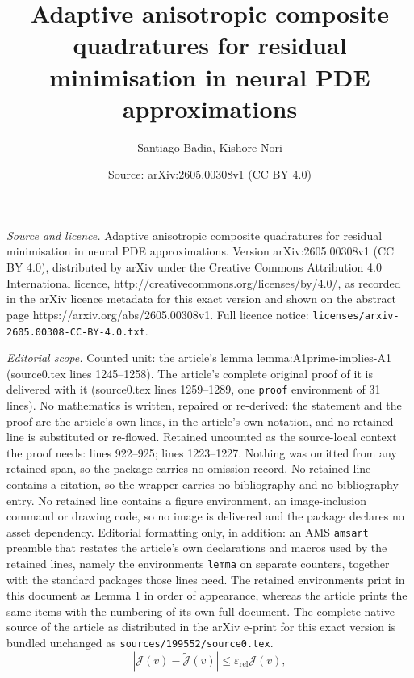 \documentclass[10pt,a4paper]{amsart}
\title{Adaptive anisotropic composite quadratures for residual minimisation in neural PDE approximations}
\author{Santiago Badia, Kishore Nori}
\date{Source: arXiv:2605.00308v1 (CC BY 4.0)}
\providecommand{\scrJ}{\mathscr{J}}
\begin{document}
\maketitle

\noindent\emph{Source and licence.} Adaptive anisotropic composite quadratures for residual minimisation in neural PDE approximations. Version arXiv:2605.00308v1 (CC BY 4.0), distributed by arXiv under the Creative Commons Attribution 4.0 International licence, http://creativecommons.org/licenses/by/4.0/, as recorded in the arXiv licence metadata for this exact version and shown on the abstract page https://arxiv.org/abs/2605.00308v1. Full licence notice: \texttt{licenses/arxiv-2605.00308-CC-BY-4.0.txt}.\par\smallskip

\noindent\textit{Editorial scope.} Counted unit: the article's lemma lemma:A1prime-implies-A1 (source0.tex lines 1245--1258). The article's complete original proof of it is delivered with it (source0.tex lines 1259--1289, one \texttt{proof} environment of 31 lines). No mathematics is written, repaired or re-derived: the statement and the proof are the article's own lines, in the article's own notation, and no retained line is substituted or re-flowed.  Retained uncounted as the source-local context the proof needs: lines 922--925; lines 1223--1227.  Nothing was omitted from any retained span, so the package carries no omission record.  No retained line contains a citation, so the wrapper carries no bibliography and no bibliography entry.  No retained line contains a figure environment, an image-inclusion command or drawing code, so no image is delivered and the package declares no asset dependency.  Editorial formatting only, in addition: an AMS \texttt{amsart} preamble that restates the article's own declarations and macros used by the retained lines, namely the environments \texttt{lemma} on separate counters, together with the standard packages those lines need.  The retained environments print in this document as Lemma 1 in order of appearance, whereas the article prints the same items with the numbering of its own full document.  The complete native source of the article as distributed in the arXiv e-print for this exact version is bundled unchanged as \texttt{sources/199552/source0.tex}.
\begin{equation}\label{eq:rel_int_error}
  |\scrJ(v) - \tilde{\scrJ}(v)| \leq \varepsilon_{\mathrm{rel}} \scrJ(v), %
  \tag{A1}
\end{equation}
\end{document}
